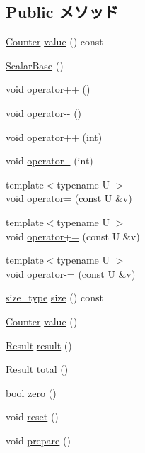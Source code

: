 \subsection*{Public メソッド}
\begin{DoxyCompactItemize}
\item 
\hyperlink{namespaceStats_ac35128c026c72bb36af9cea00774e8a6}{Counter} \hyperlink{classStats_1_1ScalarBase_aa9e486cb7eb0ad44f5f89923594b68a4}{value} () const 
\item 
\hyperlink{classStats_1_1ScalarBase_a7f98cb76073bfcf3ad5a22da098bb6c7}{ScalarBase} ()
\item 
void \hyperlink{classStats_1_1ScalarBase_a00f008b80917746917b874d00abd02a9}{operator++} ()
\item 
void \hyperlink{classStats_1_1ScalarBase_a59f5b5b0d341cf7bd8d23f8f9f96edce}{operator-\/-\/} ()
\item 
void \hyperlink{classStats_1_1ScalarBase_a2aefc5a84a51687145f8514f4029c26c}{operator++} (int)
\item 
void \hyperlink{classStats_1_1ScalarBase_a132d549c024fd011da9b2f96319c5395}{operator-\/-\/} (int)
\item 
{\footnotesize template$<$typename U $>$ }\\void \hyperlink{classStats_1_1ScalarBase_a0f6b0032b20a50bedaf20aab2f87f09d}{operator=} (const U \&v)
\item 
{\footnotesize template$<$typename U $>$ }\\void \hyperlink{classStats_1_1ScalarBase_a057ed2b8eaf6c5c5bad1c143d8449cb6}{operator+=} (const U \&v)
\item 
{\footnotesize template$<$typename U $>$ }\\void \hyperlink{classStats_1_1ScalarBase_a7f5bf4b1be35c726f936b48640ee3b4b}{operator-\/=} (const U \&v)
\item 
\hyperlink{namespaceStats_ada51e68d31936547d3729c82daf6b7c6}{size\_\-type} \hyperlink{classStats_1_1ScalarBase_a503ab01f6c0142145d3434f6924714e7}{size} () const 
\item 
\hyperlink{namespaceStats_ac35128c026c72bb36af9cea00774e8a6}{Counter} \hyperlink{classStats_1_1ScalarBase_aced120d8613c6808b53daaa566cbaa27}{value} ()
\item 
\hyperlink{namespaceStats_ad874d2cfd4b4a29ebd480bb2e67f20ae}{Result} \hyperlink{classStats_1_1ScalarBase_aea8f59b8c65010e4fd2ef239e8f1589b}{result} ()
\item 
\hyperlink{namespaceStats_ad874d2cfd4b4a29ebd480bb2e67f20ae}{Result} \hyperlink{classStats_1_1ScalarBase_a9ce6f3b063255d3afd5627cde6f61f2c}{total} ()
\item 
bool \hyperlink{classStats_1_1ScalarBase_a80f684bcfd8af096435375afa29d6da2}{zero} ()
\item 
void \hyperlink{classStats_1_1ScalarBase_ad20897c5c8bd47f5d4005989bead0e55}{reset} ()
\item 
void \hyperlink{classStats_1_1ScalarBase_a1825b40ca3bc3a1ba67fdb58fac5015c}{prepare} ()
\end{DoxyCompactItemize}
